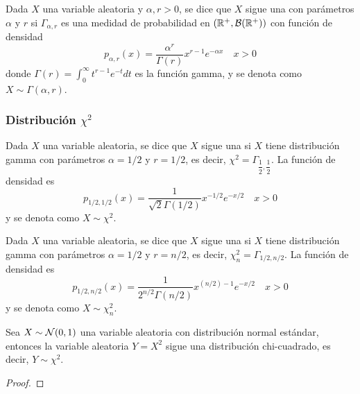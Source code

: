 \begin{definicion}
    Dada $X$ una variable aleatoria y $\alpha,r>0$, se dice que $X$ sigue una  con parámetros $\alpha$ y $r$ si $\Gamma_{\alpha,r}$ es una medidad de probabilidad en $(\mathbb{R}^+, \mathcal{B}(\mathbb{R}^+))$ con función de densidad
    \begin{equation*}
        p_{\alpha,r}(x) = \dfrac{\alpha^r}{\Gamma(r)} x^{r - 1} e^{-\alpha x} \quad x> 0
    \end{equation*}
    donde $\Gamma(r) = \int_0^{\infty} t^{r - 1} e^{-t} dt$ es la función gamma, y se denota como $X \sim \Gamma(\alpha,r)$.
\end{definicion}

\subsubsection{Distribución $\chi^2$}

\begin{definicion}
    Dada $X$ una variable aleatoria, se dice que $X$ sigue una  si $X$ tiene distribución gamma con parámetros $\alpha = 1/2$ y $r = 1/2$, es decir, \mbox{$\chi^2 = \Gamma_{\dfrac{1}{2}, \dfrac{1}{2}}$}. La función de densidad es
    \begin{equation*}
        p_{1/2,1/2}(x) = \dfrac{1}{\sqrt{2}\Gamma(1/2)} x^{-1/2} e^{-x/2} \quad x> 0
    \end{equation*}
    y se denota como $X \sim \chi^2$.
\end{definicion}

\begin{definicion}
    Dada $X$ una variable aleatoria, se dice que $X$ sigue una  si $X$ tiene distribución gamma con parámetros $\alpha = 1/2$ y $r = n/2$, es decir, $\chi^2_n = \Gamma_{1/2, n/2}$. La función de densidad es
    \begin{equation*}
        p_{1/2,n/2}(x) = \dfrac{1}{2^{n/2}\Gamma(n/2)} x^{(n/2) - 1} e^{-x/2} \quad x> 0
    \end{equation*}
    y se denota como $X \sim \chi^2_n$.
\end{definicion}

\begin{prop}
    Sea $X \sim \mathcal{N}(0,1)$ una variable aleatoria con distribución normal estándar, entonces la variable aleatoria $Y = X^2$ sigue una distribución chi-cuadrado, es decir, $Y \sim \chi^2$.
    \begin{proof}
    \end{proof}
\end{prop}

